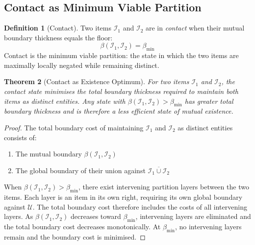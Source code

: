 \documentclass[11pt,twocolumn,a4paper]{article}
\theoremstyle{plain}
\newtheorem{theorem}{Theorem}[section]
\theoremstyle{definition}
\newtheorem{definition}[theorem]{Definition}
\theoremstyle{remark}
\begin{document}
\subsection{Contact as Minimum Viable Partition}
\label{subsec:contact_min}

\begin{definition}[Contact]
\label{def:contact}
Two items $\mathcal{I}_1$ and $\mathcal{I}_2$ are in \emph{contact} when their
mutual boundary thickness equals the floor:
\begin{equation}
    \beta(\mathcal{I}_1, \mathcal{I}_2) = \beta_{\min}
    \label{eq:contact}
\end{equation}
Contact is the minimum viable partition: the state in which the two items are
maximally locally negated while remaining distinct.
\end{definition}

\begin{theorem}[Contact as Existence Optimum]
\label{thm:contact_optimum}
For two items $\mathcal{I}_1$ and $\mathcal{I}_2$, the contact state minimises
the total boundary thickness required to maintain both items as distinct entities.
Any state with $\beta(\mathcal{I}_1, \mathcal{I}_2) > \beta_{\min}$ has greater
total boundary thickness and is therefore a less efficient state of mutual
existence.
\end{theorem}

\begin{proof}
The total boundary cost of maintaining $\mathcal{I}_1$ and $\mathcal{I}_2$ as
distinct entities consists of:
\begin{enumerate}
    \item The mutual boundary $\beta(\mathcal{I}_1, \mathcal{I}_2)$
    \item The global boundary of their union against $\overline{\mathcal{I}_1
          \cup \mathcal{I}_2}$
\end{enumerate}
When $\beta(\mathcal{I}_1, \mathcal{I}_2) > \beta_{\min}$, there exist
intervening partition layers between the two items. Each layer is an item in its
own right, requiring its own global boundary against $\mathcal{U}$. The total
boundary cost therefore includes the costs of all intervening layers. As
$\beta(\mathcal{I}_1, \mathcal{I}_2)$ decreases toward $\beta_{\min}$,
intervening layers are eliminated and the total boundary cost decreases
monotonically. At $\beta_{\min}$, no intervening layers remain and the boundary
cost is minimised.
\end{proof}
\end{document}
